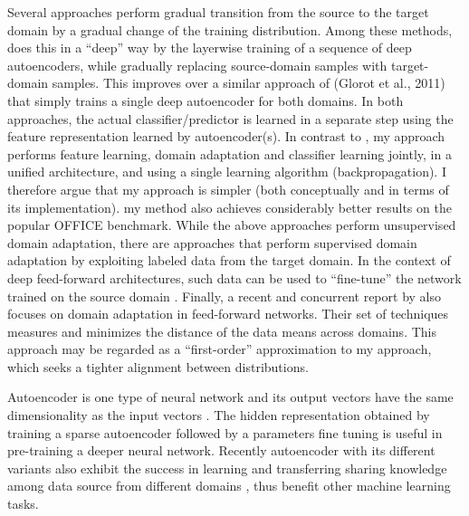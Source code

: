 \documentclass{iitthesis}
\begin{document}
Several approaches perform gradual transition from the source to the target domain \cite{gopalan2011domain} \cite{gong2012geodesic} by a gradual change of the training distribution. Among these methods, \cite{chopra2013dlid} does this in a “deep” way by the layerwise training of a sequence of deep autoencoders, while gradually replacing source-domain samples with target-domain samples. This improves over a similar approach of (Glorot et al., 2011) that simply trains a single deep autoencoder for both domains. In both approaches, the actual classifier/predictor is learned in a separate step using the feature representation learned by autoencoder(s). In contrast to \cite{glorot2011domain} \cite{chopra2013dlid}, my approach performs
feature learning, domain adaptation and classifier learning jointly, in a unified architecture, and using a single learning algorithm (backpropagation). I therefore argue that my approach is simpler (both conceptually and in terms of its implementation). my method also achieves considerably better results on the popular OFFICE benchmark. While the above approaches perform unsupervised domain adaptation, there are approaches that perform supervised domain adaptation by exploiting labeled data from the target domain. In the context of deep feed-forward architectures, such data can be used to “fine-tune” the network trained on the source domain \cite{zeiler2014visualizing} \cite{oquab2014learning} \cite{babenko2014neural}. Finally, a recent and concurrent report by \cite{tzeng2014deep} also focuses on domain adaptation in feed-forward networks. Their set of techniques measures and minimizes the distance of the data means across domains. This approach may be regarded as a “first-order” approximation to my approach, which seeks a tighter alignment between distributions.





























Autoencoder is one type of neural network and its output vectors have the same dimensionality as the input vectors \cite{vincent2008ICML}. The hidden representation obtained by training a sparse autoencoder followed by a parameters fine tuning is useful in pre-training a deeper neural network. Recently autoencoder with its different variants \cite{MarginalizedDenoisingAutoencoders2012ICML,Glorot11domainadaptation} also exhibit the success in learning and transferring sharing knowledge among data source from different domains \cite{BP:12,BY:12,DJ:13},
thus benefit other machine learning tasks. 
\end{document}
